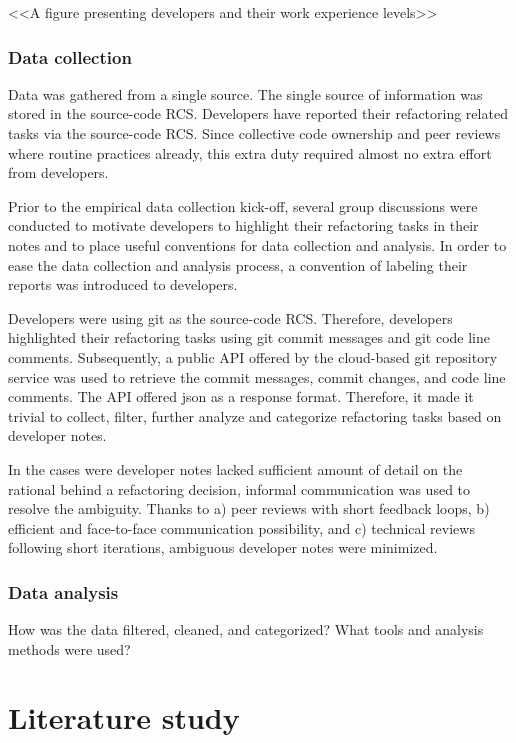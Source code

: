 \documentclass[english,12pt,a4paper,pdftex,sci,utf8]{aaltothesis}
\begin{document}
<<A figure presenting developers and their work experience levels>>

\subsubsection{Data collection} \label{data collection}
Data was gathered from a single source. The single source of information was stored in the source-code \gls{RCS}. Developers have reported their refactoring related tasks via the source-code \gls{RCS}. Since collective code ownership and peer reviews where routine practices already, this extra duty required almost no extra effort from developers. 

Prior to the empirical data collection kick-off, several group discussions were conducted to motivate developers to highlight their refactoring tasks in their notes and to place useful conventions for data collection and analysis. In order to ease the data collection and analysis process, a convention of labeling their reports was introduced to developers.

Developers were using git as the source-code \gls{RCS}. Therefore, developers highlighted their refactoring tasks using git commit messages and git code line comments. Subsequently, a public API offered by the cloud-based git repository service was used to retrieve the commit messages, commit changes, and code line comments. The API offered json as a response format. Therefore, it made it trivial to collect, filter, further analyze and categorize refactoring tasks based on developer notes.  

In the cases were developer notes lacked sufficient amount of detail on the rational behind a refactoring decision, informal communication was used to resolve the ambiguity. Thanks to a) peer reviews with short feedback loops, b) efficient and face-to-face communication possibility, and c) technical reviews following short iterations, ambiguous developer notes were minimized. 

\subsubsection{Data analysis} \label{data analysis}
How was the data filtered, cleaned, and categorized? What tools and analysis methods were used?

\clearpage

\section{Literature study} \label{literature}
\end{document}
